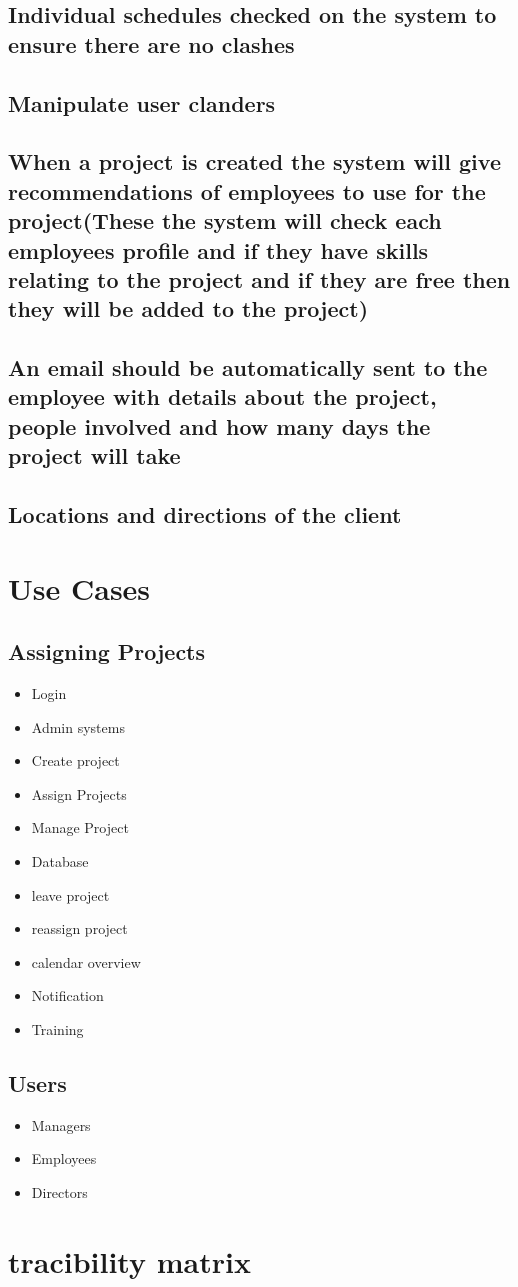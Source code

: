 \documentclass{article}
\begin{document}
	\subsection{Individual schedules checked on the system to ensure there are no clashes}
	\subsection{Manipulate user clanders}
	\subsection{When a project is created the system will give recommendations of employees to use for the project(These the system will check each employees profile and if they have skills relating to the project and if they are free then they will be added to the project)}
	\subsection{An email should be automatically sent to the employee with details about the project, people involved and how many days the project will take}
	\subsection{Locations and directions of the client}
  
  \section{Use Cases}
  \begin{paragraph}
	\subsection{Assigning Projects}
		\begin{itemize}
			\item Login 
			\item Admin systems
			\item Create project
			\item Assign Projects
			\item Manage Project 
			\item Database
			\item leave project
			\item reassign project
			\item calendar overview
			\item Notification
			\item Training
		\end{itemize}
		
	\subsection{Users}
		\begin{itemize}
			\item Managers
			\item Employees
			\item Directors
		\end{itemize}
  \end{paragraph}
  
  \section{tracibility matrix}
  \begin{paragraph}
  
  \end{paragraph}
  
\end{document}
